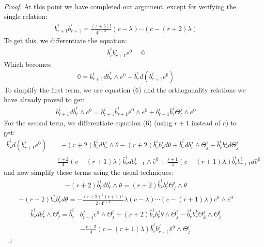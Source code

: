 \documentclass[11pt]{amsart}
\theoremstyle{definition}
\theoremstyle{definition}
\begin{document}
\begin{proof}
\bigskip

At this point we have completed our argument, except for verifying the single relation:
%
\begin{align*}
b^i_{r+1} \bar{b}^i_{r+1} = \frac{(r+3)!}{4^{r+2}} (c- \lambda) \cdots (c - (r+2) \lambda )
\end{align*}
%
To get this, we differentiate the equation:
%
\begin{align*}
\bar{b}^i_r b^i_{r+1} e^0 = 0
\end{align*}
%
Which becomes:
%
\begin{align*}
0 = b^i_{r+1} d \bar{b}^i_r \wedge e^0 + \bar{b}^i_r d( b^i_{r+1} e^0 )
\end{align*}
%
To simplify the first term, we use equation (6) and the orthogonality relations we have already proved to get:
%
\begin{align*}
b^i_{r+1} d \bar{b}^i_r \wedge e^0 = b^i_{r+1} \bar{b}^i_{r+1} \bar{e}^0 \wedge e^0 + b^i_{r+1} \bar{b}^j_{r} \Theta^j_i \wedge e^0
\end{align*}
%
For the second term, we differentiate equation (6) (using $r+1$ instead of $r$) to get:
%
\begin{align*}
\bar{b}^i_r d( b^i_{r+1} e^0 ) &= - (r+2) \bar{b}^i_r d b^i_r \wedge \theta - (r+2) \bar{b}^i_r b^i_r d \theta + \bar{b}^i_r d b^j_r \wedge \Theta^i_j + \bar{b}^i_r b^j_r d \Theta^i_j \\
&+ \frac{r+2}{4}( c  - (r+1) \lambda ) \bar{b}^i_r d b^i_{r-1} \wedge \bar{e}^0 + \frac{r+1}{4} (c - (r+1) \lambda ) \bar{b}^i_r b^i_{r+1} d \bar{e}^0
\end{align*}
%
and now simplify these terms using the usual techniques:
%
\begin{align*}
- (r+2) \bar{b}^i_r d b^i_r \wedge \theta = (r+2) \bar{b}^i_r b^j_r \Theta^i_j \wedge \theta
\end{align*}
%
\begin{align*}
- (r+2) \bar{b}^i_r b^i_r d \theta = - \frac{(r+2)^2 (r+1)!}{2 \cdot 4^{r+1}} \lambda (c- \lambda) \cdots (c - (r+1) \lambda) e^0 \wedge \bar{e}^0
\end{align*}
%
\begin{align*}
\bar{b}^i_r d b^j_r \wedge \Theta^i_j = \bar{b}^i_r & b^j_{r+1} e^0 \wedge \Theta^i_j + (r+2) \bar{b}^i_r b^j_r \theta \wedge \Theta^i_j - \bar{b}^i_r b^k_r \Theta^j_k \wedge \Theta^i_j \\
&- \frac{r+2}{4} (c - (r + 1) \lambda ) \bar{b}^i_r b^j_{r-1} \bar{e}^0 \wedge \Theta^i_j
\end{align*}

\end{proof}
\end{document}
